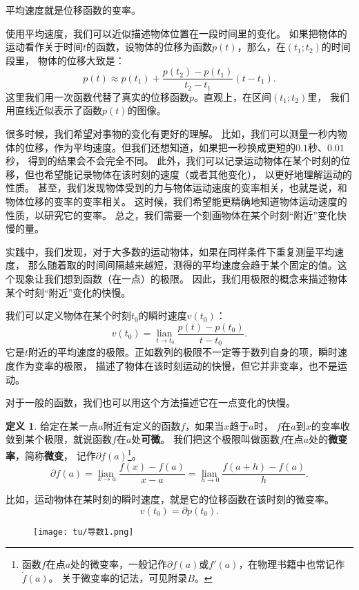\documentclass[12pt,UTF8]{ctexbook}
\newcommand{\lian}[1]{
    \underset{#1}{\operatorname{lian}\,}
}
\theoremstyle{definition}
\newtheorem{df}{定义}[section]
\theoremstyle{plain}
\begin{document}
平均速度就是位移函数的变率。

使用平均速度，我们可以近似描述物体位置在一段时间里的变化。
如果把物体的运动看作关于时间$t$的函数，设物体的位移为函数$p(t)$，那么，在$(t_1; t_2)$的时间段里，
物体的位移大致是：
$$ p(t) \approx p(t_1) + \frac{p(t_2) - p(t_1)}{t_2 - t_1}(t - t_1).$$
这里我们用一次函数代替了真实的位移函数$p$。直观上，在区间$(t_1; t_2)$里，
我们用直线近似表示了函数$p(t)$的图像。

很多时候，我们希望对事物的变化有更好的理解。
比如，我们可以测量一秒内物体的位移，作为平均速度。但我们还想知道，如果把一秒换成更短的$0.1$秒、$0.01$秒，
得到的结果会不会完全不同。
此外，我们可以记录运动物体在某个时刻的位移，但也希望能记录物体在该时刻的速度（或者其他变化），
以更好地理解运动的性质。
甚至，我们发现物体受到的力与物体运动速度的变率相关，也就是说，和物体位移的变率的变率相关。
这时候，我们希望能更精确地知道物体运动速度的性质，以研究它的变率。
总之，我们需要一个刻画物体在某个时刻“附近”变化快慢的量。

实践中，我们发现，对于大多数的运动物体，如果在同样条件下重复测量平均速度，
那么随着取的时间间隔越来越短，测得的平均速度会趋于某个固定的值。这个现象让我们想到函数（在一点）的极限。
因此，我们用极限的概念来描述物体某个时刻“附近”变化的快慢。

我们可以定义物体在某个时刻$t_0$的瞬时速度$v(t_0)$：
$$ v(t_0) = \lian{t\to t_0} \frac{p(t) - p(t_0)}{t - t_0}.$$
它是$t$附近的平均速度的极限。正如数列的极限不一定等于数列自身的项，瞬时速度作为变率的极限，
描述了物体在该时刻运动的快慢，但它并非变率，也不是运动。

对于一般的函数，我们也可以用这个方法描述它在一点变化的快慢。

\begin{df}\label{df:2-1-0}
    给定在某一点$a$附近有定义的函数$f$，如果当$x$趋于$a$时，
    $f$在$a$到$x$的变率收敛到某个极限，就说函数$f$在$a$处\textbf{可微}。
    我们把这个极限叫做函数$f$在点$a$处的\textbf{微变率}，简称\textbf{微变}，
    记作$\partial f(a)$\footnote{函数$f$在点$a$处的微变率，一般记作$\partial f(a)$或$f'(a)$，在物理书籍中也常记作$\dot{f}(a)$。
    关于微变率的记法，可见附录$B$。}。
    $$ \partial f(a) = \lian{x\to a} \frac{f(x) - f(a)}{x - a} = \lian{h\to 0} \frac{f(a + h) - f(a)}{h}.$$
\end{df}

比如，运动物体在某时刻的瞬时速度，就是它的位移函数在该时刻的微变率。
$$ v(t_0) = \partial p(t_0).$$

\begin{figure}[h]
    \vspace{4pt}
    \centering
    \texttt{[image: tu/导数1.png]}
\end{figure}
\end{document}
